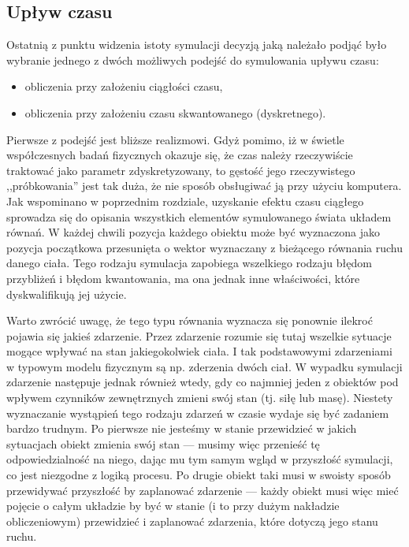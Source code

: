 {\subsection{Upływ czasu}
\par{
Ostatnią z punktu widzenia istoty symulacji decyzją jaką należało podjąć było wybranie jednego z dwóch możliwych podejść do symulowania upływu czasu:

\begin{itemize}
\item obliczenia przy założeniu ciągłości czasu,
\item obliczenia przy założeniu czasu skwantowanego (dyskretnego).
\end{itemize}
}
\par{
Pierwsze z podejść jest bliższe realizmowi. Gdyż pomimo, iż w świetle współczesnych badań fizycznych okazuje się, że czas należy rzeczywiście traktować jako parametr zdyskretyzowany, to gęstość jego rzeczywistego ,,próbkowania'' jest tak duża, że nie sposób obsługiwać ją przy użyciu komputera.
Jak wspominano w poprzednim rozdziale, uzyskanie efektu czasu ciągłego sprowadza się do opisania wszystkich elementów symulowanego świata układem równań. W każdej chwili pozycja każdego obiektu może być wyznaczona jako pozycja początkowa przesunięta o wektor wyznaczany z bieżącego równania ruchu danego ciała. Tego rodzaju symulacja zapobiega wszelkiego rodzaju błędom przybliżeń i błędom kwantowania, ma ona jednak inne właściwości, które dyskwalifikują jej użycie.
}
\par{
Warto zwrócić uwagę, że tego typu równania wyznacza się ponownie ilekroć pojawia się jakieś zdarzenie. Przez zdarzenie rozumie się tutaj wszelkie sytuacje mogące wpływać na stan jakiegokolwiek ciała. I tak podstawowymi zdarzeniami w typowym modelu fizycznym są np. zderzenia dwóch ciał. W wypadku symulacji zdarzenie następuje jednak również wtedy, gdy co najmniej jeden z obiektów pod wpływem czynników zewnętrznych zmieni swój stan (tj. siłę lub masę). Niestety wyznaczanie wystąpień tego rodzaju zdarzeń w czasie wydaje się być zadaniem bardzo trudnym. Po pierwsze nie jesteśmy w stanie przewidzieć w jakich sytuacjach obiekt zmienia swój stan --- musimy więc przenieść tę odpowiedzialność na niego, dając mu tym samym wgląd w przyszłość symulacji, co jest niezgodne z logiką procesu. Po drugie obiekt taki musi w swoisty sposób przewidywać przyszłość by zaplanować zdarzenie --- każdy obiekt musi więc mieć pojęcie o całym układzie by być w stanie (i to przy dużym nakładzie obliczeniowym) przewidzieć i zaplanować zdarzenia, które dotyczą jego stanu ruchu.
}}
